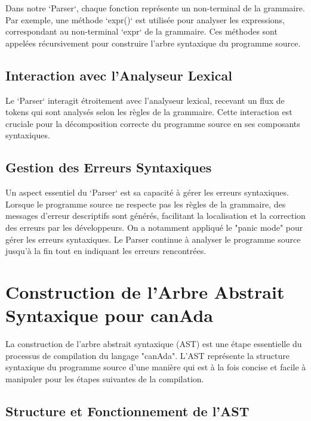 \documentclass[french,a4paper]{article}
\begin{document}
    Dans notre `Parser`, chaque fonction représente un non-terminal de la grammaire. Par exemple, une méthode `expr()` est utilisée pour analyser les expressions, correspondant au non-terminal `expr` de la grammaire. Ces méthodes sont appelées récursivement pour construire l'arbre syntaxique du programme source.

    \subsection{Interaction avec l'Analyseur Lexical}\label{subsec:interaction-avec-l'analyseur-lexical}

    Le `Parser` interagit étroitement avec l'analyseur lexical, recevant un flux de tokens qui sont analysés selon les règles de la grammaire. Cette interaction est cruciale pour la décomposition correcte du programme source en ses composants syntaxiques.

    \subsection{Gestion des Erreurs Syntaxiques}\label{subsec:gestion-des-erreurs-syntaxiques}

    Un aspect essentiel du `Parser` est sa capacité à gérer les erreurs syntaxiques. Lorsque le programme source ne respecte pas les règles de la grammaire, des messages d'erreur descriptifs sont générés, facilitant la localisation et la correction des erreurs par les développeurs. On a notamment appliqué le "panic mode" pour gérer les erreurs syntaxiques. Le Parser continue à analyser le programme source jusqu'à la fin tout en indiquant les erreurs rencontrées.

    \section{Construction de l'Arbre Abstrait Syntaxique pour canAda}\label{sec:construction-de-l'arbre-abstrait-syntaxique-pour-canada}

    La construction de l'arbre abstrait syntaxique (AST) est une étape essentielle du processus de compilation du langage "canAda". L'AST représente la structure syntaxique du programme source d'une manière qui est à la fois concise et facile à manipuler pour les étapes suivantes de la compilation.

    \subsection{Structure et Fonctionnement de l'AST}\label{subsec:structure-et-fonctionnement-de-l'ast}
\end{document}
